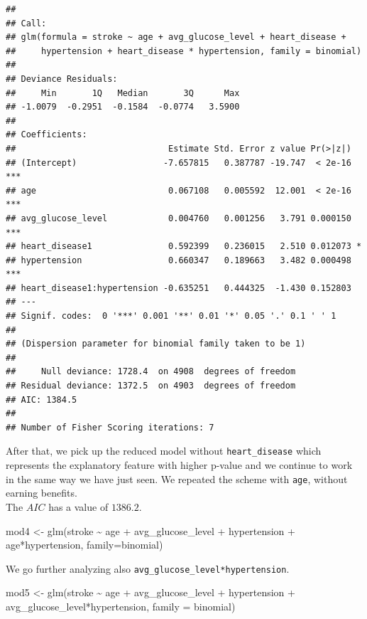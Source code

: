 \documentclass[
]{article}
\newenvironment{Shaded}{\begin{snugshade}}{\end{snugshade}}
\newcommand{\AttributeTok}[1]{\textcolor[rgb]{0.77,0.63,0.00}{#1}}
\newcommand{\FunctionTok}[1]{\textcolor[rgb]{0.00,0.00,0.00}{#1}}
\newcommand{\NormalTok}[1]{#1}
\newcommand{\OtherTok}[1]{\textcolor[rgb]{0.56,0.35,0.01}{#1}}
\newcommand{\SpecialCharTok}[1]{\textcolor[rgb]{0.00,0.00,0.00}{#1}}
\begin{document}
\begin{verbatim}
## 
## Call:
## glm(formula = stroke ~ age + avg_glucose_level + heart_disease + 
##     hypertension + heart_disease * hypertension, family = binomial)
## 
## Deviance Residuals: 
##     Min       1Q   Median       3Q      Max  
## -1.0079  -0.2951  -0.1584  -0.0774   3.5900  
## 
## Coefficients:
##                              Estimate Std. Error z value Pr(>|z|)    
## (Intercept)                 -7.657815   0.387787 -19.747  < 2e-16 ***
## age                          0.067108   0.005592  12.001  < 2e-16 ***
## avg_glucose_level            0.004760   0.001256   3.791 0.000150 ***
## heart_disease1               0.592399   0.236015   2.510 0.012073 *  
## hypertension                 0.660347   0.189663   3.482 0.000498 ***
## heart_disease1:hypertension -0.635251   0.444325  -1.430 0.152803    
## ---
## Signif. codes:  0 '***' 0.001 '**' 0.01 '*' 0.05 '.' 0.1 ' ' 1
## 
## (Dispersion parameter for binomial family taken to be 1)
## 
##     Null deviance: 1728.4  on 4908  degrees of freedom
## Residual deviance: 1372.5  on 4903  degrees of freedom
## AIC: 1384.5
## 
## Number of Fisher Scoring iterations: 7
\end{verbatim}

After that, we pick up the reduced model without \texttt{heart\_disease}
which represents the explanatory feature with higher p-value and we
continue to work in the same way we have just seen. We repeated the
scheme with \texttt{age}, without earning benefits.\\
The \(AIC\) has a value of \(1386.2\).

\begin{Shaded}
\begin{Highlighting}[]
\NormalTok{mod4 }\OtherTok{\textless{}{-}} \FunctionTok{glm}\NormalTok{(stroke }\SpecialCharTok{\textasciitilde{}}\NormalTok{ age }\SpecialCharTok{+}\NormalTok{ avg\_glucose\_level }\SpecialCharTok{+}\NormalTok{ hypertension }\SpecialCharTok{+}\NormalTok{ age}\SpecialCharTok{*}\NormalTok{hypertension,}
              \AttributeTok{family=}\NormalTok{binomial)}
\end{Highlighting}
\end{Shaded}

We go further analyzing also \texttt{avg\_glucose\_level*hypertension}.

\begin{Shaded}
\begin{Highlighting}[]
\NormalTok{mod5 }\OtherTok{\textless{}{-}} \FunctionTok{glm}\NormalTok{(stroke }\SpecialCharTok{\textasciitilde{}}\NormalTok{ age }\SpecialCharTok{+}\NormalTok{ avg\_glucose\_level }\SpecialCharTok{+}\NormalTok{ hypertension }\SpecialCharTok{+} 
\NormalTok{              avg\_glucose\_level}\SpecialCharTok{*}\NormalTok{hypertension, }\AttributeTok{family =}\NormalTok{ binomial)}
\end{Highlighting}
\end{Shaded}
\end{document}

